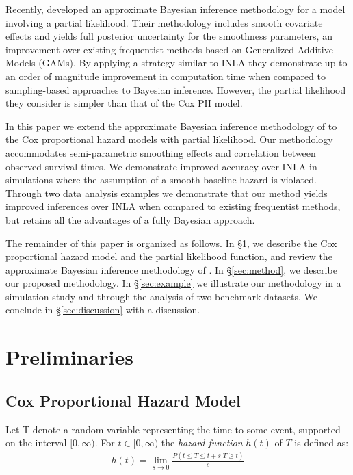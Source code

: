\documentclass[]{article}
\begin{document}
Recently, \citet{casecross} developed an approximate Bayesian inference methodology for a model involving a partial likelihood. Their methodology includes smooth covariate effects and yields full posterior uncertainty for the smoothness parameters, an improvement over existing frequentist methods based on Generalized Additive Models (GAMs). By applying a strategy similar to INLA they demonstrate up to an order of magnitude improvement in computation time when compared to sampling-based approaches to Bayesian inference. However, the partial likelihood they consider is simpler than that of the Cox PH model.

In this paper we extend the approximate Bayesian inference methodology of \citet{casecross} to the Cox proportional hazard models with partial likelihood. Our methodology accommodates semi-parametric smoothing effects and correlation between observed survival times. We demonstrate improved accuracy over INLA in simulations where the assumption of a smooth baseline hazard is violated. Through two data analysis examples we demonstrate that our method yields improved inferences over INLA when compared to existing frequentist methods, but retains all the advantages of a fully Bayesian approach.

The remainder of this paper is organized as follows. In \S\ref{sec:prelim}, we describe the Cox proportional hazard model and the partial likelihood function, and review the approximate Bayesian inference methodology of \citet{casecross}. In \S\ref{sec:method}, we describe our proposed methodology. In \S\ref{sec:example} we illustrate our methodology in a simulation study and through the analysis of two benchmark datasets. We conclude in \S\ref{sec:discussion} with a discussion.



\section{Preliminaries}\label{sec:prelim}
\subsection{Cox Proportional Hazard Model}
Let T denote a random variable representing the time to some event, supported on the interval $[0,\infty)$. For $t\in[0,\infty)$ the \textit{hazard function} $h(t)$ of $T$ is defined as:
\begin{equation}\begin{aligned}\label{eqn:hazard}
h(t) = \lim_{s\to 0} \frac{P(t\le T \le t+s |T\ge t)}{s}
\end{aligned}\end{equation}
\end{document}
